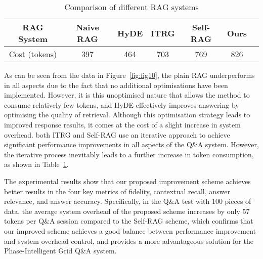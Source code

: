 \begin{table}[htbp]
\centering
\caption{Comparison of different RAG systems}
\begin{tabular}{ccccccc}
\toprule
RAG System & Naive RAG & HyDE & ITRG & Self-RAG & Ours \\
\midrule
Cost (tokens) & 397 & 464 & 703 & 769 & 826 \\
\bottomrule
\end{tabular}
\label{tab:tab8}
\end{table}


As can be seen from the data in Figure~\ref{fig:fig10}, the plain RAG underperforms in all aspects due to the fact that no additional optimisations have been implemented. However, it is this unoptimised nature that allows the method to consume relatively few tokens, and HyDE effectively improves answering by optimising the quality of retrieval. Although this optimisation strategy leads to improved response results, it comes at the cost of a slight increase in system overhead. both ITRG and Self-RAG use an iterative approach to achieve significant performance improvements in all aspects of the Q\&A system. However, the iterative process inevitably leads to a further increase in token consumption, as shown in Table~\ref{tab:tab8}.

The experimental results show that our proposed improvement scheme achieves better results in the four key metrics of fidelity, contextual recall, answer relevance, and answer accuracy. Specifically, in the Q\&A test with 100 pieces of data, the average system overhead of the proposed scheme increases by only 57 tokens per Q\&A session compared to the Self-RAG scheme, which confirms that our improved scheme achieves a good balance between performance improvement and system overhead control, and provides a more advantageous solution for the Phase-Intelligent Grid Q\&A system.

%


